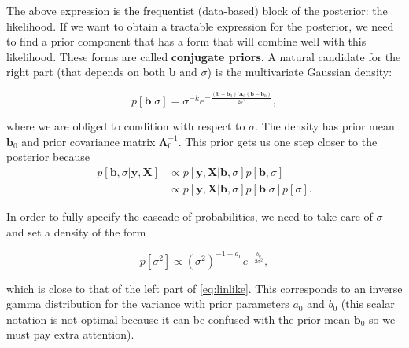 The above expression is the frequentist (data-based) block of the posterior: the likelihood. If we want to obtain a tractable expression for the posterior, we need to find a prior component that has a form that will combine well with this likelihood. These forms are called \textbf{conjugate priors}. A natural candidate for the right part (that depends on both \textbf{b} and $\sigma$) is the multivariate Gaussian density:

\begin{equation}
\label{eq:linprior}
p[\textbf{b}|\sigma]=\sigma^{-k}e^{-\frac{(\textbf{b}-\textbf{b}_0)'\boldsymbol{\Lambda}_0(\textbf{b}-\textbf{b}_0)}{2\sigma^2}},
\end{equation}

where we are obliged to condition with respect to $\sigma$. The density has prior mean $\textbf{b}_0$ and prior covariance matrix $\boldsymbol{\Lambda}_0^{ -1}$. This prior gets us one step closer to the posterior because
\begin{align}
p[\textbf{b},\sigma|\textbf{y},\textbf{X}]& \propto p[\textbf{y},\textbf{X}|\textbf{b},\sigma]p[\textbf{b},\sigma] \\
&\propto p[\textbf{y},\textbf{X}|\textbf{b},\sigma]p[\textbf{b}|\sigma]p[\sigma]. 
\end{align}

In order to fully specify the cascade of probabilities, we need to take care of $\sigma$ and set a density of the form

\begin{equation}
\label{eq:linsig}
p[\sigma^2]\propto (\sigma^2)^{-1-a_0}e^{-\frac{b_0}{2\sigma^2}},
\end{equation}

which is close to that of the left part of \ref{eq:linlike}. This corresponds to an inverse gamma distribution for the variance with prior parameters $a_0$ and $b_0$ (this scalar notation is not optimal because it can be confused with the prior mean $\textbf{b}_0$ so we must pay extra attention).

